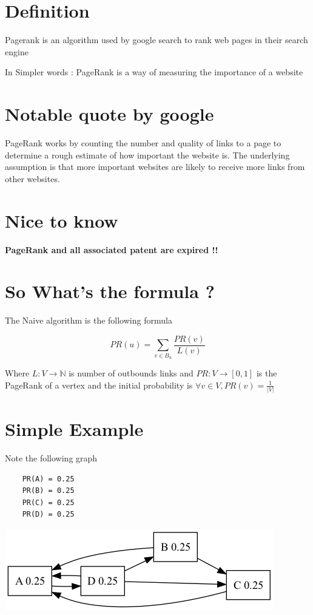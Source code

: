 \documentclass[11pt]{article}
\author{Barak-Nadav Diker}
\date{\today}
\title{}
\begin{document}
\section*{Definition}
\label{sec:orgfb98bf2}
Pagerank is an algorithm used by google search to rank web pages
in their search engine

In Simpler words : PageRank is a way of measuring the importance of a website

\section*{Notable quote by google}
\label{sec:orgb6d0d5c}
PageRank works by counting the number and quality of links to a page to determine a rough estimate of how important the website is. The underlying assumption is that more important websites are likely to receive more links from other websites.
\section*{Nice to know}
\label{sec:orge745c3b}
\textbf{PageRank and all associated patent are expired !!}



\section*{So What's the formula ?}
\label{sec:orgfbc1dac}
The Naive algorithm is the following formula

\[ PR(u) = \sum_{v \in B_u}\frac{PR(v)}{L(v)} \]

Where \(L \colon V \to \mathbb{N}\) is number of outbounds links
and \(PR \colon V \to [0,1]\) is the PageRank of a vertex
and the initial probability is \(\forall v \in V , PR(v)=\frac{1}{|V|}\)



\section*{Simple Example}
\label{sec:org61f9a39}

Note the following graph

\begin{verbatim}
    PR(A) = 0.25
    PR(B) = 0.25
    PR(C) = 0.25
    PR(D) = 0.25
\end{verbatim}

\begin{center}
\includegraphics[width=.9\linewidth]{simple_example1.png}
\end{center}
\end{document}
